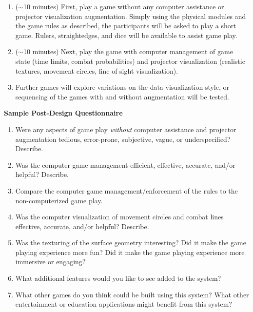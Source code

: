 \documentclass[10pt]{article}
\begin{document}
\begin{enumerate}

\item ($\sim$10 minutes) First, play a game without any computer
  assistance or projector visualization augmentation.  Simply using
  the physical modules and the game rules as described, the
  participants will be asked to play a short game.  Rulers,
  straightedges, and dice will be available to assist game play.

\item ($\sim$10 minutes) Next, play the game with computer
  management of game state (time limits, combat probabilities) and
  projector visualization (realistic textures, movement circles, line
  of sight visualization).

\item Further games will explore variations on the data visualization
  style, or sequencing of the games with and without augmentation will
  be tested.

\end{enumerate}


\newpage

\noindent
{\bf {\Large Sample Post-Design Questionnaire}}

\vspace{0.1in}

\begin{enumerate}

\item
Were any aspects of game play {\em without} computer assistance and
projector augmentation tedious, error-prone, subjective, vague, or
underspecified?  Describe.

\item
Was the computer game management efficient, effective, accurate,
and/or helpful?  Describe. 

\item 
Compare the computer game management/enforcement of the rules to the
non-computerized game play.

\item
Was the computer visualization of movement circles and combat lines
effective, accurate, and/or helpful?  Describe.

\item
Was the texturing of the surface geometry interesting?  Did it make
the game playing experience more fun?  Did it make the game playing
experience more immersive or engaging?

\item
What additional features would you like to see added to the system?

\item 
What other games do you think could be built using this system?  What
other entertainment or education applications might benefit from this
system?

\end{enumerate}
\end{document}
